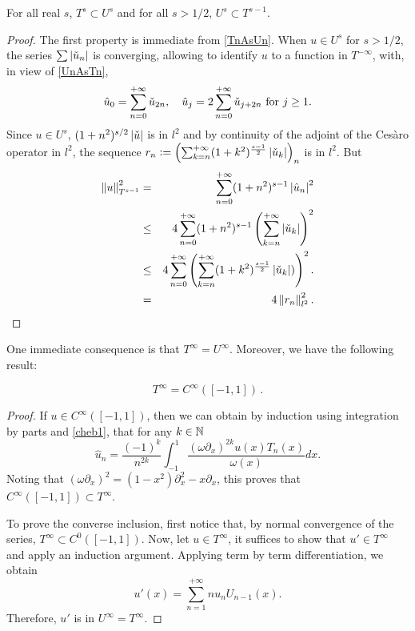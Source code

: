 \documentclass[a4paper]{article}
\begin{document}
\begin{Lem}
	\label{inclusionsTsUs}
	For all real $s$, $T^s \subset U^s$ and for all $s > 1/2$, $U^s \subset T^{s-1}$.
\end{Lem}
\begin{proof}
	The first property is immediate from \eqref{TnAsUn}. 
	When $u \in U^{s}$ for $s > 1/2$, the series $\sum \left\lvert \check{u}_n \right\rvert$ is converging, allowing to identify $u$ to a function in $T^{-\infty}$, with, in view of \eqref{UnAsTn}, 
	\[\hat{u}_{0} = \sum_{n=0}^{+ \infty} \check{u}_{2n}, \quad  \hat{u}_j = 2\sum_{n=0}^{+\infty} \check{u}_{j + 2n} \textup{ for } j \geq 1.\]
	Since $u \in U^s$, $(1+n^2)^{s/2} \left\lvert \check{u} \right\rvert$ is in $l^2$ and by continuity of the adjoint of the Cesàro operator in $l^2$, the sequence $r_n \mathrel{\mathop:}= \left( \sum_{k=n}^{+ \infty} (1+k^2)^{\frac{s-1}{2}} \left\lvert \check{u}_k \right\rvert\right)_n$ is in $l^2$. But
	\begin{eqnarray*}
		\left\|u\right\|_{T^{s-1}}^2 &=& \sum_{n=0}^{+ \infty} (1 + n^2)^{s-1} \left\lvert \hat{u}_n \right\rvert^2\\ 
		&\leq& 4\sum_{n=0}^{+\infty}(1+n^2)^{s-1} \left(\sum_{k=n}^{+\infty} \left\lvert \check{u}_k \right\rvert\right)^2 \\
		&\leq& 4\sum_{n=0}^{+ \infty}\left(\sum_{k=n}^{+\infty}(1+k^2)^{\frac{s-1}{2}} \left\lvert \check{u}_k \right\rvert)\right)^2.\\
		&=& 4\left\|r_n\right\|^2_{l^2}.
	\end{eqnarray*}	
\end{proof}
One immediate consequence is that $T^{\infty} = U^{\infty}$.  Moreover, we have the following result:
\begin{Lem}
	\[T^{\infty} = C^{\infty}([-1,1])\,.\]
	\label{LemTinfCinf}
\end{Lem}
\begin{proof}
	If $u \in C^{\infty}([-1,1])$, then we can obtain by induction using integration by parts and \eqref{cheb1}, that for any $k \in \mathbb{N}$
	\[\hat{u}_n = \frac{(-1)^k}{n^{2k}} \int_{-1}^{1} \dfrac{(\omega\partial_x)^{2k} u(x) T_n(x)}{\omega(x)}dx.\]
	Noting that $(\omega \partial_x)^2 = (1-x^2)\partial_x^2 - x \partial_ x$, this proves that $C^{\infty}([-1,1]) \subset T^{\infty}$. 
	
	To prove the converse inclusion, first notice that, by normal convergence of the series, $T^{\infty} \subset C^0([-1,1]) $. Now, let $u \in T^{\infty}$, it suffices to show that $u' \in T^{\infty}$ and apply an induction argument. Applying term by term differentiation, we obtain
	\[u'(x) = \sum_{n=1}^{+\infty} n u_n U_{n-1}(x).\] 
	Therefore, $u'$ is in $U^{\infty} = T^{\infty}$. 
\end{proof}
\end{document}
